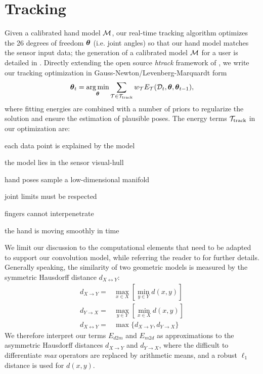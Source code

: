 

\section{Tracking}
\label{sec:tracking}
Given a calibrated hand model $\mathcal{M}$, our real-time tracking algorithm optimizes the 26 degrees of freedom $\boldsymbol{\theta}$ (i.e. joint angles) so that our hand model matches the sensor input data; the generation of a calibrated model $\mathcal{M}$ for a user is detailed in . Directly extending the open source \emph{htrack} framework of \cite{tagliasacchi2015robust}, we write our tracking optimization in Gauss-Newton/Levenberg-Marquardt form
% 
\begin{eqnarray}
\boldsymbol{\theta}_t = \operatorname*{arg\,min}_{\boldsymbol{\theta}}
\sum_{\mathcal{T} \in {\mathcal{T}_\text{track}}} 
w_\mathcal{T} E_\mathcal{T}(\mathcal{D}_t,\boldsymbol{\theta},\boldsymbol{\theta}_{t-1}),
\label{eq:htrack}
\end{eqnarray}
% 
where fitting energies are combined with a number of priors to regularize the solution and ensure the estimation of plausible poses. The energy terms ${\mathcal{T}_\text{track}}$ in our optimization are:
% 
\begin{description}[labelsep=0em,labelwidth=.6in,labelindent=.25cm,itemsep=-.6em]
    \item[d2m]          each data point is explained by the model
    \item[m2d]          the model lies in the sensor visual-hull
    \item[pose]         hand poses sample a low-dimensional manifold
    \item[limits]       joint limits must be respected
    \item[collision]    fingers cannot interpenetrate
    \item[temporal]     the hand is moving smoothly in time
\end{description}
% 
We limit our discussion to the computational elements that need to be adapted to support our convolution model, while referring the reader to \cite{tagliasacchi2015robust} for further details. 
% 
Generally speaking, the similarity of two geometric models is measured by the symmetric Hausdorff distance $d_{X \leftrightarrow Y}$:
% 
\begin{eqnarray*}
d_{X \rightarrow Y} =& \max_{x \in X} \left[ \min_{y \in Y} d(x,y) \right] \\
d_{Y \rightarrow X} =& \max_{y \in Y} \left[ \min_{x \in X} d(x,y) \right] \\
d_{X \leftrightarrow Y} =& \max \{ d_{X \rightarrow Y}, d_{Y \rightarrow X} \}
\end{eqnarray*}
We therefore interpret our terms $E_{d2m}$ and $E_{m2d}$ as approximations to the asymmetric Hausdorff distances $d_{X \rightarrow Y}$ and $d_{Y \rightarrow X}$, where the difficult to differentiate \emph{max} operators are replaced by arithmetic means, and a robust $\ell_1$ distance is used for $d(x,y)$. 

